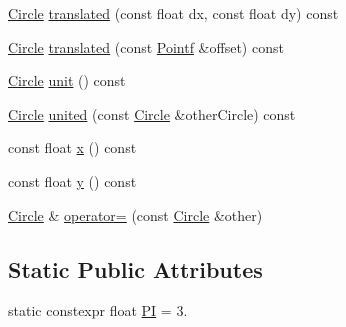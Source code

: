 \begin{DoxyCompactItemize}
\item 
\hyperlink{classprism_1_1_circle}{Circle} \hyperlink{classprism_1_1_circle_a255dcfc157fc52c83e0cbd9e54a65b89}{translated} (const float dx, const float dy) const 
\item 
\hyperlink{classprism_1_1_circle}{Circle} \hyperlink{classprism_1_1_circle_a7592ecc319feeaa2b446505b975b97c5}{translated} (const \hyperlink{classprism_1_1_pointf}{Pointf} \&offset) const 
\item 
\hyperlink{classprism_1_1_circle}{Circle} \hyperlink{classprism_1_1_circle_a9b5c163bfdb6d39fb890fa3a21a77a20}{unit} () const 
\item 
\hyperlink{classprism_1_1_circle}{Circle} \hyperlink{classprism_1_1_circle_a8e34ff5188e91cfe080264e106909f6e}{united} (const \hyperlink{classprism_1_1_circle}{Circle} \&other\+Circle) const 
\item 
const float \hyperlink{classprism_1_1_circle_ae1f729f8fa34605123628e67b230b6be}{x} () const 
\item 
const float \hyperlink{classprism_1_1_circle_a6edc045d912b0d278bd0673af028290e}{y} () const 
\item 
\hyperlink{classprism_1_1_circle}{Circle} \& \hyperlink{classprism_1_1_circle_a5d06dde86a136d7ddda2b5db211e4392}{operator=} (const \hyperlink{classprism_1_1_circle}{Circle} \&other)
\end{DoxyCompactItemize}
\subsection*{Static Public Attributes}
\begin{DoxyCompactItemize}
\item 
static constexpr float \hyperlink{classprism_1_1_circle_a83124fb14e0f926a977d2b5e6b259bfa}{PI} = 3.
\end{DoxyCompactItemize}
